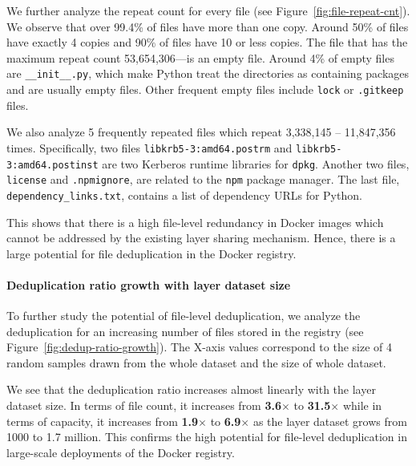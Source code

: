 We further analyze the repeat count for every file (see Figure~\ref{fig:file-repeat-cnt}).
%
%
We observe that over 99.4\% of files have more than one copy.
%
Around 50\% of files have exactly 4 copies and 90\% of files have 10 or less
copies. 
%
The file that has the maximum repeat count 53,654,306---is an empty file.
%
Around 4\% of empty files are \texttt{\_\_init\_\_.py}, which make Python treat the 
directories as containing packages and are usually empty files. 
Other frequent empty files include
\texttt{lock} or \texttt{.gitkeep} files.

We also analyze 5 frequently repeated files which repeat 3,338,145 -- 11,847,356 times.
Specifically, two files 
\texttt{libkrb5-3:amd64.postrm} and \texttt{libkrb5-3:amd64.postinst}
are two Kerberos runtime libraries for \texttt{dpkg}.
Another two files, \texttt{license} and \texttt{.npmignore}, are related to the \texttt{npm} package manager.
The last file, \texttt{dependency\_links.txt}, contains a list of dependency URLs for Python.

This shows that there is a high file-level redundancy in Docker images
which cannot be addressed by the existing layer sharing mechanism. Hence,
there is a large potential for file deduplication in the Docker registry.

\paragraph{Deduplication ratio growth with layer dataset size}


To further study the potential of file-level deduplication, we analyze the deduplication
for an increasing number of files stored in the registry (see Figure~\ref{fig:dedup-ratio-growth}).
%
%
The X-axis values correspond to the size of 4 random samples drawn from the whole dataset and the size of whole dataset.

We see that the deduplication ratio increases almost linearly with the layer dataset size.
%
In terms of file count, it increases from \textbf{3.6$\times$} to \textbf{31.5$\times$} while
in terms of capacity, it increases from \textbf{1.9$\times$} to
\textbf{6.9$\times$} as the layer dataset grows from 1000 to 1.7 million.
%
This confirms the high potential for file-level deduplication in large-scale
deployments of the Docker registry.
%
